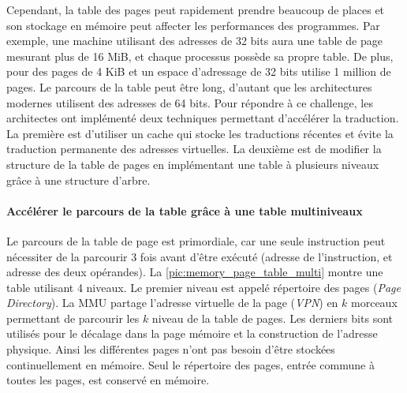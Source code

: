 Cependant, la table des pages peut rapidement prendre beaucoup de places et son stockage en mémoire peut affecter les performances des programmes. Par exemple, une machine utilisant des adresses de 32 bits aura une table de page mesurant plus de 16 MiB, et chaque processus possède sa propre table. De plus, pour des pages de 4 KiB et un espace d'adressage de 32 bits utilise 1 million de pages. Le parcours de la table peut être long, d'autant que les architectures modernes utilisent des adresses de 64 bits. Pour répondre à ce challenge, les architectes ont implémenté deux techniques permettant d'accélérer la traduction. La première est d'utiliser un cache qui stocke les traductions récentes et évite la traduction permanente des adresses virtuelles. La deuxième est de modifier la structure de la table de pages en implémentant une table à plusieurs niveaux grâce à une structure d'arbre. 

\paragraph{Accélérer le parcours de la table grâce à une table multiniveaux} Le parcours de la table de page est primordiale, car une seule instruction peut nécessiter de la parcourir 3 fois avant d'être exécuté (adresse de l'instruction, et adresse des deux opérandes). La \autoref{pic:memory_page_table_multi} montre une table utilisant 4 niveaux. Le premier niveau est appelé répertoire des pages (\textit{Page Directory}). La MMU partage l'adresse virtuelle de la page (\textit{VPN}) en $k$ morceaux permettant de parcourir les $k$ niveau de la table de pages. Les derniers bits sont utilisés pour le décalage dans la page mémoire et la construction de l'adresse physique. Ainsi les différentes pages  n'ont pas besoin d'être stockées continuellement en mémoire. Seul le répertoire des pages, entrée commune à toutes les pages, est conservé en mémoire. 



